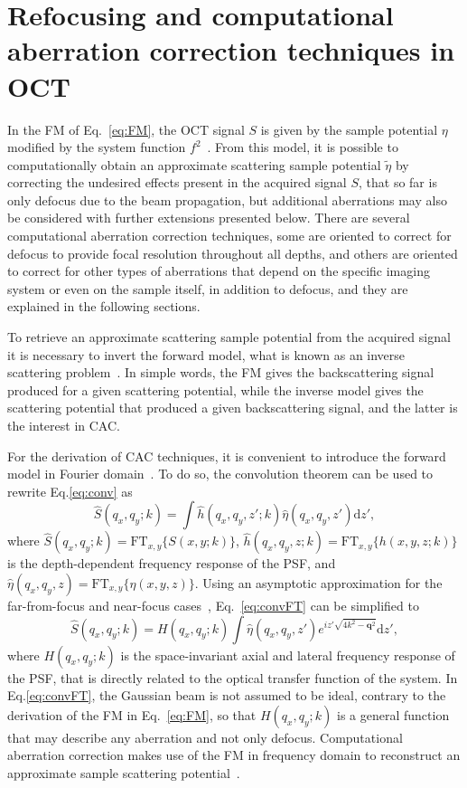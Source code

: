 \section{Refocusing and computational aberration correction techniques in OCT}\label{CAC}

In the FM of Eq.~\ref{eq:FM}, the OCT signal $S$ is given by the sample potential $\eta$ modified by the system function $f^2$~\cite{Marks2006_Inverse}. From this model, it is possible to computationally obtain an approximate scattering sample potential $\tilde{\eta}$ by correcting the undesired effects present in the acquired signal $S$, that so far is only defocus due to the beam propagation, but additional aberrations may also be considered with further extensions presented below. There are several computational aberration correction techniques, some are oriented to correct for defocus to provide focal resolution throughout all depths, and others are oriented to correct for other types of aberrations that depend on the specific imaging system or even on the sample itself, in addition to defocus, and they are explained in the following sections.

To retrieve an approximate scattering sample potential from the acquired signal it is necessary to invert the forward model, what is known as an inverse scattering problem~\cite{Ralston2006_Interferometric}. In simple words, the FM gives the backscattering signal produced for a given scattering potential, while the inverse model gives the scattering potential that produced a given backscattering signal, and the latter is the interest in CAC.

For the derivation of CAC techniques, it is convenient to introduce the forward model in Fourier domain~\cite{Liu2017_Computational}. To do so, the convolution theorem can be used to rewrite Eq.\eqref{eq:conv} as
\begin{equation}\label{eq:convFT}
    \hat{S}(q_x, q_y; k) = \int \hat{h}(q_x, q_y, z'; k) \hat{\eta}(q_x, q_y, z') \text{d}z',
\end{equation}
where $\hat{S}(q_x, q_y; k)=\text{FT}_{x,y}\{S(x,y;k)\}$, $\hat{h}(q_x, q_y, z; k)=\text{FT}_{x,y}\{h(x,y,z;k)\}$ is the depth-dependent frequency response of the PSF, and $\hat{\eta}(q_x, q_y, z)=\text{FT}_{x,y}\{\eta(x,y,z)\}$. Using an asymptotic approximation for the far-from-focus and near-focus cases~\cite{Davis2007_Nonparaxial}, Eq.~\eqref{eq:convFT} can be simplified to
\begin{equation}\label{eq:FMft}
    \hat{S}(q_x, q_y; k) = H(q_x, q_y; k) \int \hat{\eta}(q_x, q_y, z') e^{iz'\sqrt{4k^2-\mathbf{q}^2}} \text{d}z',
\end{equation}
where $H(q_x, q_y; k)$ is the space-invariant axial and lateral frequency response of the PSF, that is directly related to the optical transfer function of the system. In Eq.\eqref{eq:convFT}, the Gaussian beam is not assumed to be ideal, contrary to the derivation of the FM in Eq.~\eqref{eq:FM}, so that $H(q_x, q_y; k)$ is a general function that may describe any aberration and not only defocus. Computational aberration correction makes use of the FM in frequency domain to reconstruct an approximate sample scattering potential~\cite{Liu2017_Computational}.

